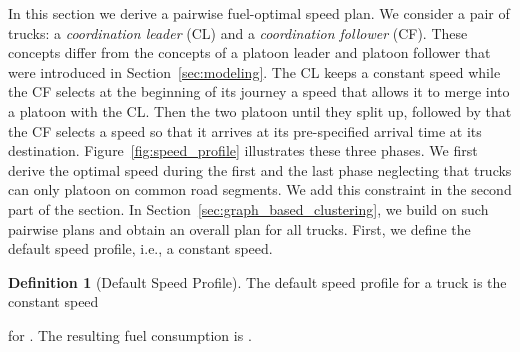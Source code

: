 \documentclass[letterpaper,10pt,conference,twocolumn]{IEEEtran}
\theoremstyle{definition}
\newtheorem{defi}{Definition}
\begin{document}
In this section we derive a pairwise fuel-optimal speed plan. We consider a pair of trucks: a \textit{coordination leader} (CL) and a \textit{coordination follower} (CF). These concepts differ from the concepts of a platoon leader and platoon follower that were introduced in Section~\ref{sec:modeling}. The CL keeps a constant speed while the CF selects at the beginning of its journey a speed that allows it to merge into a platoon with the CL. Then the two platoon until they split up, followed by that the CF selects a speed so that it arrives at its pre-specified arrival time at its destination. Figure~\ref{fig:speed_profile} illustrates these three phases. We first derive the optimal speed during the first and the last phase neglecting that trucks can only platoon on common road segments. We add this constraint in the second part of the section. In Section~\ref{sec:graph_based_clustering}, we build on such pairwise plans and obtain an overall plan for all  trucks. First, we define the default speed profile, i.e., a constant speed.
\begin{defi}[Default Speed Profile]
The default speed profile for a truck  is the constant speed

for .
The resulting fuel consumption is . 
\end{defi}
\end{document}
